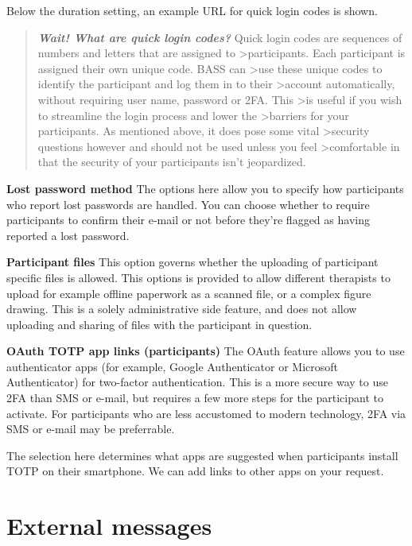 \documentclass[
]{book}
\begin{document}
Below the duration setting, an example URL for quick login codes is shown.

\begin{quote}
\textbf{\emph{Wait! What are quick login codes?}}
Quick login codes are sequences of numbers and letters that are assigned to \textgreater participants. Each participant is assigned their own unique code. BASS can \textgreater use these unique codes to identify the participant and log them in to their \textgreater account automatically, without requiring user name, password or 2FA. This \textgreater is useful if you wish to streamline the login process and lower the \textgreater barriers for your participants. As mentioned above, it does pose some vital \textgreater security questions however and should not be used unless you feel \textgreater comfortable in that the security of your participants isn't jeopardized.
\end{quote}

\textbf{Lost password method}
The options here allow you to specify how participants who report lost passwords are handled. You can choose whether to require participants to confirm their e-mail or not before they're flagged as having reported a lost password.

\textbf{Participant files}
This option governs whether the uploading of participant specific files is allowed. This options is provided to allow different therapists to upload for example offline paperwork as a scanned file, or a complex figure drawing. This is a solely administrative side feature, and does not allow uploading and sharing of files with the participant in question.

\textbf{OAuth TOTP app links (participants)}
The OAuth feature allows you to use authenticator apps (for example, Google Authenticator or Microsoft Authenticator) for two-factor authentication. This is a more secure way to use 2FA than SMS or e-mail, but requires a few more steps for the participant to activate. For participants who are less accustomed to modern technology, 2FA via SMS or e-mail may be preferrable.

The selection here determines what apps are suggested when participants install TOTP on their smartphone. We can add links to other apps on your request.

\chapter{External messages}\label{extmess}
\end{document}
